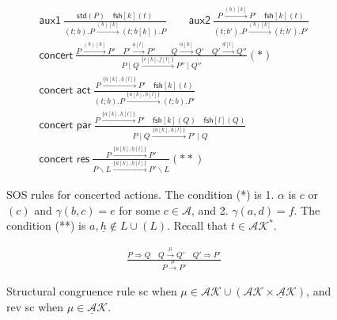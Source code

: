 \documentclass[review]{elsarticle}
\newcommand{\paral}{\; \vert \;}
\newcommand{\Rule}[2]{\displaystyle{\frac{#1}{#2}}}
\newcommand{\tran}[1]{\stackrel{#1}{\rightarrow}}
\newcommand{\mAK}{\mathcal{AK}}
\newcommand{\umAK}{\underline{\mathcal{A}}\mathcal{K}}
\newcommand{\rom}[1]{\mbox{\rm{#1}}}
\newcommand{\std}[1]{\mathsf{std}(#1)}
\newcommand{\fresh}[2]{\mathsf{fsh}[#1](#2)}
\newcommand{\bydef}{\stackrel{\emph{def}}{=}}
\newcommand{\rulename}[1]{\textsf{#1}}
\begin{document}
\begin{figure}[t] 
\[
\begin{array}{l}
\rulename{aux1}\ 
\Rule{\std{P} \quad \fresh{k}{t}}
{(t;b).P \xrightarrow{(b)[k]}(t;b[k]).P}
\qquad
\rulename{aux2}\
\Rule
{P \xrightarrow{(b)[k]} P' \quad \fresh{k}{t}}
{(t;b').P \xrightarrow{(b)[k]} (t;b').P'}
\\[25pt]
\rulename{concert}\ 
\Rule
{P\xrightarrow{(b)[k]}P' \quad P'\xrightarrow{\underline{a}[l]}P'' \qquad Q\xrightarrow{\alpha[k]}Q' 
  \quad Q'\xrightarrow{\underline{d}[l]}Q''%
 }
{P \paral Q\xrightarrow{\{e[k],\underline{f}[l]\}} P'' \paral Q''} (*)\\[25pt]
\rulename{concert act}\
\Rule
{P \xrightarrow{\{{a}[k], \underline{h}[l]\}} P' \quad \fresh{k}{t}}
{(t;b).P \xrightarrow{\{{a}[k], \underline{h}[l]\}} (t;b).P'}\\[25pt]
\rulename{concert par}\
\Rule
{P \xrightarrow{\{{a}[k], \underline{h}[l]\}} P'\quad \fresh{k}{Q} \quad \fresh{l}{Q}}
{P \paral Q \xrightarrow{\{{a}[k], \underline{h}[l]\}} P' \paral Q}\\[25pt]
\rulename{concert res}\
\Rule
{P \xrightarrow{\{{a}[k], \underline{h}[l]\}} P'}
{P\backslash L \xrightarrow{\{{a}[k], \underline{h}[l]\}} P'\backslash L} (**)
%
\end{array}
\] 
\caption{SOS rules for concerted actions. The condition (*) is 1. $\alpha$ is $c$ or $(c)$ 
and $\gamma(b,c)=e$ for some $c\in \mathcal{A}$, and 2. $\gamma(a,d)=f$. 
The condition (**) is $a, \underline{h}  \notin L \cup (L)$. 
Recall that $t \in \mAK^*$.} \label{fig:csos}
\end{figure}

\begin{figure}[t] 
\[
\begin{array}{l}
\Rule
{P \Rightarrow Q \quad Q \tran{\mu} Q' \quad Q' \Rightarrow P'}
{P\tran{\mu} P'} 
\end{array}
\] 
\caption{Structural congruence rule sc when $\mu\in \mAK \cup (\mAK\times \umAK)$,
and rev sc when $\mu\in \umAK$.} 
\label{fig:sc}
\end{figure}
\end{document}

